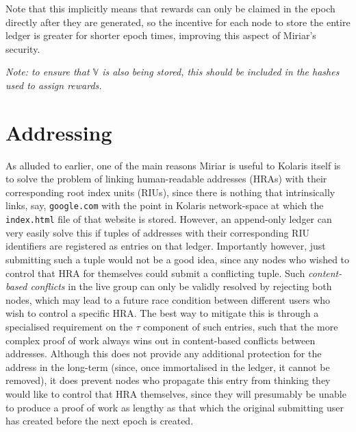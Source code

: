 \documentclass{extreport}
\begin{document}
Note that this implicitly means that rewards can only be claimed in the epoch directly after they are generated, so the incentive for each node to store the entire ledger is greater for shorter epoch times, improving this aspect of Miriar's security.

\emph{Note: to ensure that \(\mathbb{V}\) is also being stored, this should be included in the hashes used to assign rewards.}

\chapter{Addressing}
\label{sec:org9928c7d}

As alluded to earlier, one of the main reasons Miriar is useful to Kolaris itself is to solve the problem of linking human-readable addresses (HRAs) with their corresponding root index units (RIUs), since there is nothing that intrinsically links, say, \texttt{google.com} with the point in Kolaris network-space at which the \texttt{index.html} file of that website is stored. However, an append-only ledger can very easily solve this if tuples of addresses with their corresponding RIU identifiers are registered as entries on that ledger. Importantly however, just submitting such a tuple would not be a good idea, since any nodes who wished to control that HRA for themselves could submit a conflicting tuple. Such \emph{content-based conflicts} in the live group can only be validly resolved by rejecting both nodes, which may lead to a future race condition between different users who wish to control a specific HRA. The best way to mitigate this is through a specialised requirement on the \(\tau\) component of such entries, such that the more complex proof of work always wins out in content-based conflicts between addresses. Although this does not provide any additional protection for the address in the long-term (since, once immortalised in the ledger, it cannot be removed), it does prevent nodes who propagate this entry from thinking they would like to control that HRA themselves, since they will presumably be unable to produce a proof of work as lengthy as that which the original submitting user has created before the next epoch is created.
\end{document}
